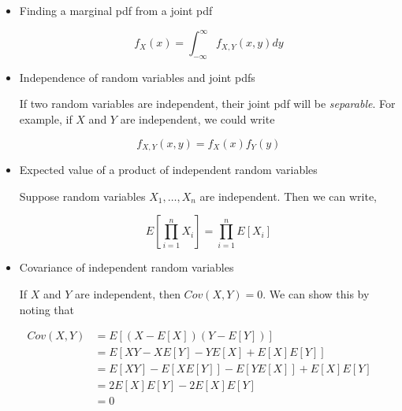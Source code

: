 \documentclass[
  letterpaper,
  DIV=11,
  numbers=noendperiod]{scrreprt}
\begin{document}
\begin{itemize}
\item
  Finding a marginal pdf from a joint pdf

  \[
  f_X(x) = \int_{-\infty}^\infty f_{X,Y}(x, y) dy
  \]
\item
  Independence of random variables and joint pdfs

  If two random variables are independent, their joint pdf will be
  \emph{separable}. For example, if \(X\) and \(Y\) are independent, we
  could write

  \[
  f_{X,Y}(x, y) = f_{X}(x)f_Y(y)
  \]
\item
  Expected value of a product of independent random variables

  Suppose random variables \(X_1, \dots, X_n\) are independent. Then we
  can write,

  \[
  E\left[\prod_{i = 1}^n X_i\right] = \prod_{i = 1}^n E[X_i]
  \]
\item
  Covariance of independent random variables

  If \(X\) and \(Y\) are independent, then \(Cov(X, Y) = 0\). We can
  show this by noting that
\end{itemize}

\begin{align}
Cov(X, Y) & = E[(X - E[X])(Y - E[Y])] \\
& = E[XY - XE[Y] - YE[X] + E[X]E[Y]] \\
& = E[XY] - E[XE[Y]] - E[YE[X]] + E[X]E[Y] \\
& =  2E[X]E[Y] - 2E[X]E[Y] \\
& = 0
\end{align}
\end{document}
